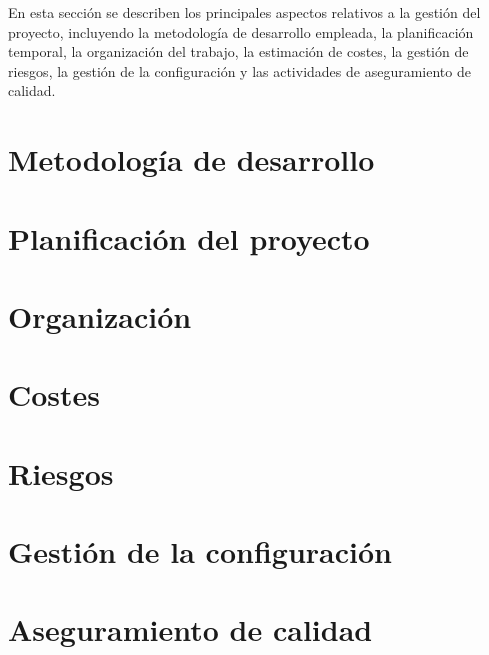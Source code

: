 En esta sección se describen los principales aspectos relativos a la gestión del proyecto, incluyendo la metodología de desarrollo empleada, la planificación temporal, la organización del trabajo, la estimación de costes, la gestión de riesgos, la gestión de la configuración y las actividades de aseguramiento de calidad.

\section{Metodología de desarrollo}
\label{sec:methodology}


% 

\section{Planificación del proyecto}
\label{sec:planning}


\section{Organización}
\label{sec:project-organization}


\section{Costes}
\label{sec:costs}


\section{Riesgos}
\label{sec:risks}


\section{Gestión de la configuración}
\label{sec:configuration}


\section{Aseguramiento de calidad}
\label{sec:quality}

